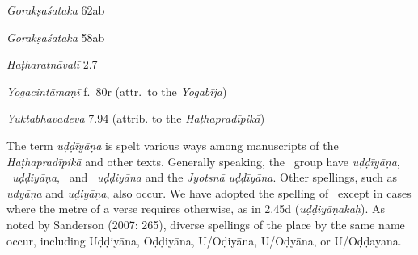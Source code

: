 \begin{ekdosis}
\begin{sources}[hp02_045]
\emph{Gorakṣaśataka} 62ab

\begin{versinnote}
\end{versinnote}
\emph{Gorakṣaśataka} 58ab

\begin{versinnote}
\end{versinnote}
\end{sources}

\begin{testimonia}[hp02_045]
\emph{Haṭharatnāvalī} 2.7

\begin{versinnote}
\end{versinnote} 

\emph{Yogacintāmaṇī} f.~80r (attr.~to the \emph{Yogabīja})

\begin{versinnote}
\end{versinnote}

\emph{Yuktabhavadeva} 7.94 (attrib. to the \emph{Haṭhapradīpikā})

\begin{versinnote}
\end{versinnote}
\end{testimonia}

\begin{philcomm}[hp02_045]
The term \emph{uḍḍīyāṇa} is spelt various ways among manuscripts of the \emph{Haṭhapradīpikā} and other texts. Generally speaking, the \textalpha\ group have \emph{uḍḍīyāṇa}, \textbeta\ \emph{uḍḍiyāṇa}, \textgamma\ and \textdelta\ \emph{uḍḍiyāna} and the \emph{Jyotsnā} \emph{uḍḍīyāna}. Other spellings, such as \emph{uḍyāṇa} and \emph{uḍiyāṇa}, also occur. We have adopted the spelling of \textalpha\ except in cases where the metre of a verse requires otherwise, as in 2.45d (\emph{uḍḍiyāṇakaḥ}). As noted by Sanderson (2007: 265), diverse spellings of the place by the same name occur, including Uḍḍiyāna, Oḍḍiyāna, U/Oḍiyāna, U/Oḍyāna, or U/Oḍḍayana. 
\end{philcomm}


\end{ekdosis}
